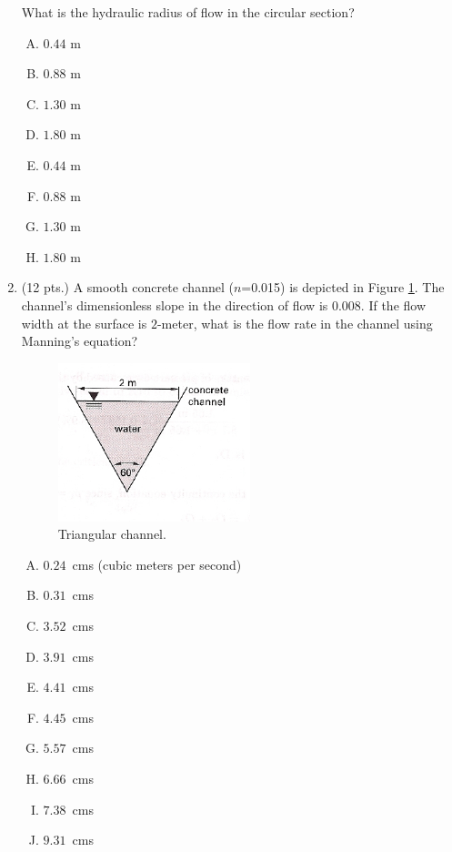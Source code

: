\documentclass[11pt]{article}
\begin{document}
\begin{enumerate}
What is the hydraulic radius of flow in the circular section?
\begin{enumerate} [(A)]
\item $0.44$ m
\item $0.88$ m
\item $1.30$ m
\item $1.80$ m
\item $0.44$ m
\item $0.88$ m
\item $1.30$ m
\item $1.80$ m
\end{enumerate}

\clearpage
\item (12 pts.)
A smooth concrete channel ($n$=0.015) is depicted in Figure \ref{fig:TriangleChannel}.  
The channel's dimensionless slope in the direction of flow is $0.008$.  
If the flow width at the surface is $2$-meter, what is the flow rate in the channel using Manning's equation?

\begin{figure}[h!] %
\centering
   \includegraphics[width=2.2in]{TriangleChannel.jpg}
   \caption{Triangular channel.}
   \label{fig:TriangleChannel} 
\end{figure}

\begin{enumerate} [(A)]
\item $0.24$~cms (cubic meters per second)
\item $0.31$~cms 
\item $3.52$~cms 
\item $3.91$~cms 
\item $4.41$~cms 
\item $4.45$~cms 
\item $5.57$~cms 
\item $6.66$~cms 
\item $7.38$~cms 
\item $9.31$~cms 
\end{enumerate}


\end{enumerate}
\end{document}
